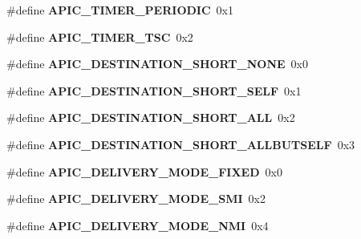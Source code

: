 \begin{DoxyCompactItemize}
\item 
\#define {\bfseries A\+P\+I\+C\+\_\+\+T\+I\+M\+E\+R\+\_\+\+P\+E\+R\+I\+O\+D\+IC}~0x1\hypertarget{group__apic__driver_gaf709e7767b94da36919b70b8097cc31d}{}\label{group__apic__driver_gaf709e7767b94da36919b70b8097cc31d}

\item 
\#define {\bfseries A\+P\+I\+C\+\_\+\+T\+I\+M\+E\+R\+\_\+\+T\+SC}~0x2\hypertarget{group__apic__driver_ga7c8722db1f95a9002295266b2f911143}{}\label{group__apic__driver_ga7c8722db1f95a9002295266b2f911143}

\item 
\#define {\bfseries A\+P\+I\+C\+\_\+\+D\+E\+S\+T\+I\+N\+A\+T\+I\+O\+N\+\_\+\+S\+H\+O\+R\+T\+\_\+\+N\+O\+NE}~0x0\hypertarget{group__apic__driver_ga2985ffbaf3d1eaee7777881ea766629d}{}\label{group__apic__driver_ga2985ffbaf3d1eaee7777881ea766629d}

\item 
\#define {\bfseries A\+P\+I\+C\+\_\+\+D\+E\+S\+T\+I\+N\+A\+T\+I\+O\+N\+\_\+\+S\+H\+O\+R\+T\+\_\+\+S\+E\+LF}~0x1\hypertarget{group__apic__driver_ga8a318631b34d96e7b53e80b8184f00cd}{}\label{group__apic__driver_ga8a318631b34d96e7b53e80b8184f00cd}

\item 
\#define {\bfseries A\+P\+I\+C\+\_\+\+D\+E\+S\+T\+I\+N\+A\+T\+I\+O\+N\+\_\+\+S\+H\+O\+R\+T\+\_\+\+A\+LL}~0x2\hypertarget{group__apic__driver_ga92c5506017298f591ee175b6243e0b34}{}\label{group__apic__driver_ga92c5506017298f591ee175b6243e0b34}

\item 
\#define {\bfseries A\+P\+I\+C\+\_\+\+D\+E\+S\+T\+I\+N\+A\+T\+I\+O\+N\+\_\+\+S\+H\+O\+R\+T\+\_\+\+A\+L\+L\+B\+U\+T\+S\+E\+LF}~0x3\hypertarget{group__apic__driver_gad9d432a14b9d9a3eaf65d236d0f56364}{}\label{group__apic__driver_gad9d432a14b9d9a3eaf65d236d0f56364}

\item 
\#define {\bfseries A\+P\+I\+C\+\_\+\+D\+E\+L\+I\+V\+E\+R\+Y\+\_\+\+M\+O\+D\+E\+\_\+\+F\+I\+X\+ED}~0x0\hypertarget{group__apic__driver_gab3dcf943c1242b9af6d618de5ce1f83a}{}\label{group__apic__driver_gab3dcf943c1242b9af6d618de5ce1f83a}

\item 
\#define {\bfseries A\+P\+I\+C\+\_\+\+D\+E\+L\+I\+V\+E\+R\+Y\+\_\+\+M\+O\+D\+E\+\_\+\+S\+MI}~0x2\hypertarget{group__apic__driver_ga8b045c6ddc04c2f8464029561596db58}{}\label{group__apic__driver_ga8b045c6ddc04c2f8464029561596db58}

\item 
\#define {\bfseries A\+P\+I\+C\+\_\+\+D\+E\+L\+I\+V\+E\+R\+Y\+\_\+\+M\+O\+D\+E\+\_\+\+N\+MI}~0x4\hypertarget{group__apic__driver_ga9ffd28c7342430384a6be4279c8791e5}{}\label{group__apic__driver_ga9ffd28c7342430384a6be4279c8791e5}


\end{DoxyCompactItemize}
